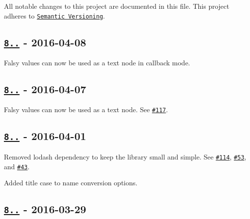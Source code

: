 All notable changes to this project are documented in this file. This project adheres to \href{http://semver.org/#semantic-versioning-200}{\tt Semantic Versioning}.

\subsection*{\href{https://github.com/oozcitak/xmlbuilder-js/compare/v8.2.1...v8.2.2}{\tt 8..} -\/ 2016-\/04-\/08}


\begin{DoxyItemize}
\item Falsy values can now be used as a text node in callback mode.
\end{DoxyItemize}

\subsection*{\href{https://github.com/oozcitak/xmlbuilder-js/compare/v8.2.0...v8.2.1}{\tt 8..} -\/ 2016-\/04-\/07}


\begin{DoxyItemize}
\item Falsy values can now be used as a text node. See \href{https://github.com/oozcitak/xmlbuilder-js/issues/117}{\tt \#117}.
\end{DoxyItemize}

\subsection*{\href{https://github.com/oozcitak/xmlbuilder-js/compare/v8.1.0...v8.2.0}{\tt 8..} -\/ 2016-\/04-\/01}


\begin{DoxyItemize}
\item Removed lodash dependency to keep the library small and simple. See \href{https://github.com/oozcitak/xmlbuilder-js/issues/114}{\tt \#114}, \href{https://github.com/oozcitak/xmlbuilder-js/issues/53}{\tt \#53}, and \href{https://github.com/oozcitak/xmlbuilder-js/issues/43}{\tt \#43}.
\item Added title case to name conversion options.
\end{DoxyItemize}

\subsection*{\href{https://github.com/oozcitak/xmlbuilder-js/compare/v8.0.0...v8.1.0}{\tt 8..} -\/ 2016-\/03-\/29}


